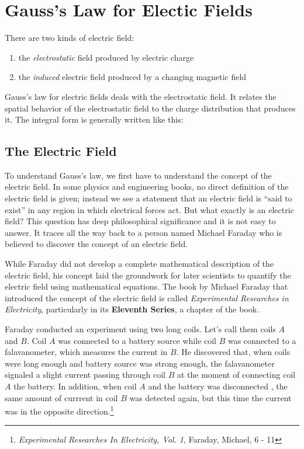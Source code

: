 \section{Gauss's Law for Electic Fields}

There are two kinds of electric field:

\begin{enumerate}
    \item the \textit{electrostatic} field produced by electric charge
    \item the \textit{induced} electric field produced by a changing magnetic field
\end{enumerate}

Gauss's law for electric fields deals with the electrostatic field. It relates the spatial behavior of the electrostatic
field to the charge distribution that produces it. The integral form is generally written like this:

\subsection{The Electric Field}

To understand Gauss's law, we first have to understand the concept of the electric field. In some physics and
engineering books, no direct definition of the electric field is given; instead we see a statement that an electric
field is ``said to exist'' in any region in which electrical forces act. But what exactly is an electric field? This
question has deep philosophical significance and it is not easy to answer. It traces all the way back to a person named
Michael Faraday who is believed to discover the concept of an electric field.

While Faraday did not develop a complete mathematical description of the electric field, his concept laid the groundwork
for later scientists to quantify the electric field using mathematical equations. The book by Michael Faraday that
introduced the concept of the electric field is called \textit{Experimental Researches in Electricity}, particularly in
its \textbf{Eleventh Series}, a chapter of the book.

Faraday conducted an experiment using two long coils. Let's call them coils $A$ and $B$. Coil $A$ was connected to a
battery source while coil $B$ was connected to a falavanometer, which measures the current in $B$. He discovered that,
when coils were long enough and battery source was strong enough, the falavanometer signaled a slight current passing
through coil $B$ at the moment of connecting coil $A$ the battery. In addition, when coil $A$ and the battery was
disconnected , the same amount of currrent in coil $B$ was detected again, but this time the current was in the opposite
direction.\footnote{\textit{Experimental Researches In Electricity, Vol. 1}, Faraday, Michael, 6 - 11}
